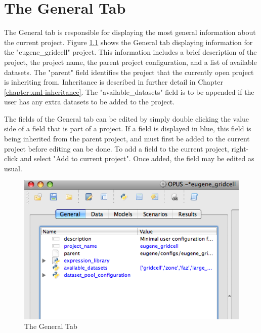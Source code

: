 \chapter{The General Tab}

The General tab is responsible for displaying the most general information about the current project.  Figure \ref{fig:general} shows the General tab displaying information for the "eugene\_gridcell" project.  This information includes a brief description of the project, the project name, the parent project configuration, and a list of available datasets.  The "parent" field identifies the project that the currently open project is inheriting from.  Inheritance is described in further detail in Chapter \ref{chapter:xml-inheritance}.  The "available\_datasets" field is to be appended if the user has any extra datasets to be added to the project.

The fields of the General tab can be edited by simply double clicking the value side of a field that is part of a project.  If a field is displayed in blue, this field is being inherited from the parent project, and must first be added to the current project before editing can be done. To add a field to the current project, right-click and select "Add to current project".  Once added, the field may be edited as usual.

\begin{figure}[htp]
\begin{center}
\includegraphics[scale=0.6]{part-gui/images/general-tab.png}
\end{center}
\caption{The General Tab}
\label{fig:general}
\end{figure}


